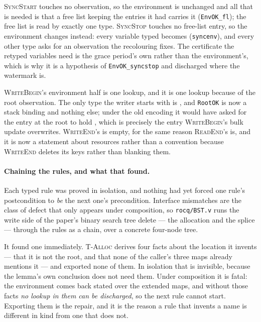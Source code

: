 \textsc{SyncStart} touches no observation, so the environment is unchanged and
all that is needed is that a free list keeping the entries it had carries it
(\texttt{EnvOK\_fl}); the free list is read by exactly one type.
\textsc{SyncStop} touches no free-list entry, so the environment changes
instead: every variable typed \unlk{} becomes \frbl{} (\texttt{syncenv}), and
every other type asks for an observation the recolouring fixes.  The certificate
the retyped variables need is the grace period's own rather than the
environment's, which is why it is a hypothesis of \texttt{EnvOK\_syncstop} and
discharged where the watermark is.

\textsc{WriteBegin}'s environment half is one lookup, and it is one lookup
because of the root observation.  The only type the writer starts with is
\rt{}, and \texttt{RootOK} is now a stack binding and nothing else; under the
old encoding it would have asked for the entry at the root to hold \rt{}, which
is precisely the entry \textsc{WriteBegin}'s bulk update overwrites.
\textsc{WriteEnd}'s is empty, for the same reason \textsc{ReadEnd}'s is, and it
is now a statement about resources rather than a convention because
\textsc{WriteEnd} deletes its keys rather than blanking them.

\paragraph{Chaining the rules, and what that found.}
Each typed rule was proved in isolation, and nothing had yet forced one rule's
postcondition to \emph{be} the next one's precondition.  Interface mismatches
are the class of defect that only appears under composition, so
\texttt{rocq/BST.v} runs the write side of the paper's binary search tree delete
--- the allocation and the splice --- through the rules as a chain, over a
concrete four-node tree.

It found one immediately.  \textsc{T-Alloc} derives four facts about the
location it invents --- that it is not the root, and that none of the caller's
three maps already mentions it --- and exported none of them.  In isolation that
is invisible, because the lemma's own conclusion does not need them.  Under
composition it is fatal: the environment comes back stated over the extended
maps, and without those facts \emph{no lookup in them can be discharged}, so the
next rule cannot start.  Exporting them is the repair, and it is the reason a
rule that invents a name is different in kind from one that does not.

